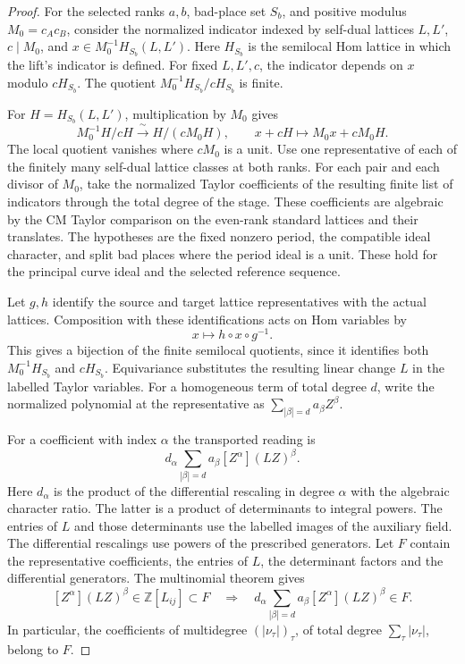 \begin{proof}
For the selected ranks \(a,b\), bad-place set \(S_b\), and
positive modulus \(M_0=c_Ac_B\), consider the normalized
indicator indexed by self-dual lattices \(L,L'\),
\(c\mid M_0\), and \(x\in M_0^{-1}H_{S_b}(L,L')\).
Here \(H_{S_b}\) is the semilocal Hom lattice in which
the lift's indicator is defined. For fixed \(L,L',c\),
the indicator depends on \(x\) modulo \(cH_{S_b}\).
The quotient \(M_0^{-1}H_{S_b}/cH_{S_b}\) is finite.

For \(H=H_{S_b}(L,L')\), multiplication by \(M_0\) gives
\[
 M_0^{-1}H/cH\xrightarrow{\ \sim\ }H/(cM_0 H),\qquad
     x+cH\longmapsto M_0 x+cM_0 H.
\]
The local quotient vanishes where \(cM_0\) is a unit.
Use one representative of each of the finitely many
self-dual lattice classes at both ranks. For each pair
and each divisor of \(M_0\), take the normalized Taylor
coefficients of the resulting finite list of indicators
through the total degree of the stage. These coefficients
are algebraic by the CM Taylor comparison on the even-rank
standard lattices and their translates. The hypotheses
are the fixed nonzero period, the compatible ideal character,
and split bad places where the period ideal is a unit.
These hold for the principal curve ideal and the selected
reference sequence.

Let \(g,h\) identify the source and target lattice representatives with the actual lattices. Composition with these identifications acts on Hom variables by
\[
 x\longmapsto h\circ x\circ g^{-1}.
\] This gives a bijection of the finite semilocal
quotients, since it identifies both \(M_0^{-1}H_{S_b}\)
and \(cH_{S_b}\). Equivariance substitutes the resulting
linear change \(L\) in the labelled Taylor variables.
For a homogeneous term of total degree \(d\), write the
normalized polynomial at the representative as
\(\sum_{|\beta|=d} a_\beta Z^\beta\).

For a coefficient with index \(\alpha\) the transported
reading is
\[
      d_\alpha\sum_{|\beta|=d}a_\beta[Z^\alpha](LZ)^\beta .
\]
Here \(d_\alpha\) is the product of the differential rescaling
in degree \(\alpha\) with the algebraic character ratio.
The latter is a product of determinants to integral powers.
The entries of \(L\) and those determinants use the labelled
images of the auxiliary field. The differential rescalings
use powers of the prescribed generators. Let \(F\) contain the representative coefficients, the entries
of \(L\), the determinant factors and the differential generators.
The multinomial theorem gives
\[
 [Z^\alpha](LZ)^\beta\in \mathbb Z[L_{ij}]\subset F
 \quad\Longrightarrow\quad
 d_\alpha\sum_{|\beta|=d}a_\beta[Z^\alpha](LZ)^\beta\in F.
\] In particular, the coefficients of multidegree
\((|\nu_\tau|)_\tau\), of total degree \(\sum_\tau|\nu_\tau|\),
belong to \(F\).


\end{proof}
